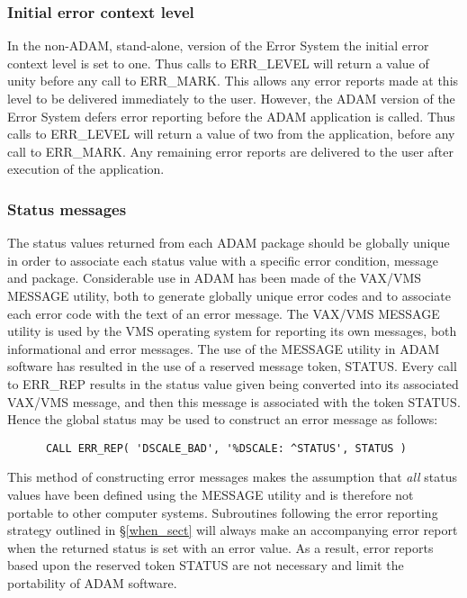 \subsubsection {Initial error context level}

In the non-ADAM, stand-alone, version of the Error System the initial error
context level is set to one.
Thus calls to ERR\_LEVEL will return a value of unity before any call to
ERR\_MARK.
This allows any error reports made at this level to be delivered immediately to
the user.
However, the ADAM version of the Error System defers error reporting before
the ADAM application is called.
Thus calls to ERR\_LEVEL will return a value of two from the application,
before any call to ERR\_MARK.
Any remaining error reports are delivered to the user after execution of
the application.


\subsubsection {Status messages}

The status values returned from each ADAM package should be globally unique in
order to associate each status value with a specific error condition, message
and package.
Considerable use in ADAM has been made of the VAX/VMS MESSAGE utility, both to
generate globally unique error codes and to associate each error code with the
text of an error message.
The VAX/VMS MESSAGE utility is used by the VMS operating system for reporting 
its own messages, both informational and error messages.
The use of the MESSAGE utility in ADAM software has resulted in the use of
a reserved message token, STATUS. 
Every call to ERR\_REP results in the status value given being converted into
its associated VAX/VMS message, and then this message is associated with the 
token STATUS.
Hence the global status may be used to construct an error message as follows:

\begin {small}
\begin{verbatim}
      CALL ERR_REP( 'DSCALE_BAD', '%DSCALE: ^STATUS', STATUS )
\end{verbatim}
\end {small}

This method of constructing error messages makes the assumption that {\em all}
status values have been defined using the MESSAGE utility and is therefore
not portable to other computer systems.
Subroutines following the error reporting strategy outlined in
\S\ref{when_sect} will always make an accompanying error report when the
returned status is set with an error value.
As a result, error reports based upon the reserved token STATUS are not
necessary and limit the portability of ADAM software.

